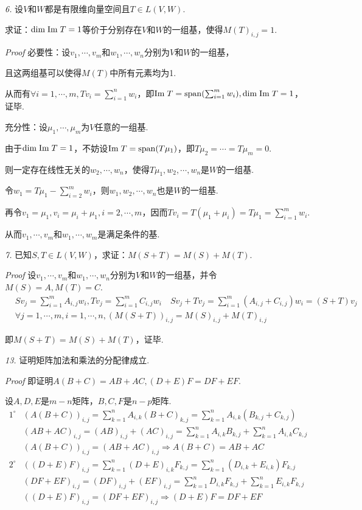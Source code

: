 \textit{6.}
设\(V\)和\(W\)都是有限维向量空间且\(T \in L(V,W)\).

求证：\(\mathrm{dim \;} \mathrm{Im \;} T=1\)等价于分别存在\(V\)和\(W\)的一组基，使得\(M(T)_{i,j}=1\).

\textit{Proof}
必要性：设\(v_1,\cdots,v_m\)和\(w_1,\cdots,w_n\)分别为\(V\)和\(W\)的一组基，

且这两组基可以使得\(M(T)\)中所有元素均为1.

从而有\(\forall i=1,\cdots,m,Tv_i=\sum_{i=1}^n w_i\)，即\(\mathrm{Im \;} T=\mathrm{span} (\sum_{i=1}^m w_i),\mathrm{dim \;} \mathrm{Im \;} T=1\)，证毕.

充分性：设\(\mu_1,\cdots,\mu_m\)为\(V\)任意的一组基.

由于\(\mathrm{dim \;} \mathrm{Im \;} T=1\)，不妨设\(\mathrm{Im \;} T=\mathrm{span} (T \mu_1)\)，即\(T \mu_2=\cdots=T \mu_m=0\).

则一定存在线性无关的\(w_2,\cdots,w_n\)，使得\(T \mu_1,w_2,\cdots,w_n\)是\(W\)的一组基.

令\(w_1=T \mu_1-\sum_{i=2}^m w_i\)，则\(w_1,w_2,\cdots,w_n\)也是\(W\)的一组基.

再令\(v_1=\mu_1,v_i=\mu_i+\mu_1,i=2,\cdots,m\)，因而\(Tv_i=T(\mu_1+\mu_i)=T \mu_1=\sum_{i=1}^m w_i\).

从而\(v_1,\cdots,v_m\)和\(w_1,\cdots,w_m\)是满足条件的基.

\hspace*{\fill}

\textit{7.}
已知\(S,T \in L(V,W)\)，求证：\(M(S+T)=M(S)+M(T)\).

\textit{Proof}
设\(v_1,\cdots,v_m\)和\(w_1,\cdots,w_n\)分别为\(V\)和\(W\)的一组基，并令\(M(S)=A,M(T)=C\).
    \begin{align*}
        &Sv_j=\sum_{i=1}^m A_{i,j}w_i,Tv_j=\sum_{i=1}^m C_{i,j}w_i \quad
        Sv_j+Tv_j=\sum_{i=1}^m (A_{i,j}+C_{i,j})w_i=(S+T)v_j \\
        &\forall j=1,\cdots,m,i=1,\cdots,n,(M(S+T))_{i,j}=M(S)_{i,j}+M(T)_{i,j}
    \end{align*}

即\(M(S+T)=M(S)+M(T)\)，证毕.

\newpage

\textit{13.}
证明矩阵加法和乘法的分配律成立.

\textit{Proof}
即证明\(A(B+C)=AB+AC,(D+E)F=DF+EF\).

设\(A,D,E\)是\(m-n\)矩阵，\(B,C,F\)是\(n-p\)矩阵.
    \begin{align*}
        1^{\circ} &(A(B+C))_{i,j}=\sum_{k=1}^n A_{i,k}(B+C)_{k,j}=\sum_{k=1}^n A_{i,k}(B_{k,j}+C_{k,j}) \\
        &(AB+AC)_{i,j}=(AB)_{i,j}+(AC)_{i,j}=\sum_{k=1}^n A_{i,k}B_{k,j}+\sum_{k=1}^n A_{i,k}C_{k,j} \\
        &(A(B+C))_{i,j}=(AB+AC)_{i,j} \Rightarrow A(B+C)=AB+AC \\
        2^{\circ} &((D+E)F)_{i,j}=\sum_{k=1}^n (D+E)_{i,k}F_{k,j}=\sum_{k=1}^n (D_{i,k}+E_{i,k})F_{k,j} \\
        &(DF+EF)_{i,j}=(DF)_{i,j}+(EF)_{i,j}=\sum_{k=1}^n D_{i,k}F_{k,j}+\sum_{k=1}^n E_{i,k}F_{k,j} \\
        &((D+E)F)_{i,j}=(DF+EF)_{i,j} \Rightarrow (D+E)F=DF+EF
    \end{align*}

